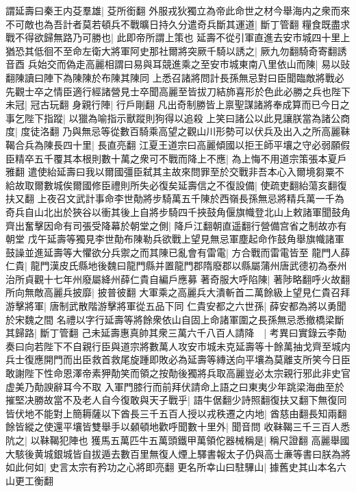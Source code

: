 謂延壽曰秦王内芟羣雄|{
	芟所銜翻}
外服戎狄獨立為帝此命世之材今舉海内之衆而來不可敵也為吾計者莫若頓兵不戰曠日持久分遣奇兵斷其運道|{
	斷丁管翻}
糧食既盡求戰不得欲歸無路乃可勝也|{
	此即帝所謂上策也}
延壽不從引軍直進去安市城四十里上猶恐其低徊不至命左衛大將軍阿史那社爾將突厥千騎以誘之|{
	厥九勿翻騎奇寄翻誘音酉}
兵始交而偽走高麗相謂曰易與耳競進乘之至安市城東南八里依山而陳|{
	易以䜴翻陳讀曰陣下為陳陳於布陳其陳同}
上悉召諸將問計長孫無忌對曰臣聞臨敵將戰必先觀士卒之情臣適行經諸營見士卒聞高麗至皆拔刀結斾喜形於色此必勝之兵也陛下未冠|{
	冠古玩翻}
身親行陣|{
	行戶剛翻}
凡出奇制勝皆上禀聖謀諸將奉成算而已今日之事乞陛下指蹤|{
	以獵為喻指示獸蹤則狗得以追殺}
上笑曰諸公以此見讓朕當為諸公商度|{
	度徒洛翻}
乃與無忌等從數百騎乘高望之觀山川形勢可以伏兵及出入之所高麗靺鞨合兵為陳長四十里|{
	長直亮翻}
江夏王道宗曰高麗傾國以拒王師平壤之守必弱願假臣精卒五千覆其本根則數十萬之衆可不戰而降上不應|{
	為上悔不用道宗策張本夏戶雅翻}
遣使紿延壽曰我以爾國彊臣弑其主故來問罪至於交戰非吾本心入爾境芻粟不給故取爾數城俟爾國修臣禮則所失必復矣延壽信之不復設備|{
	使疏吏翻紿蕩亥翻復扶又翻}
上夜召文武計事命李世勣將步騎萬五千陳於西嶺長孫無忌將精兵萬一千為奇兵自山北出於狹谷以衝其後上自將步騎四千挾鼓角偃旗幟登北山上敕諸軍聞鼓角齊出奮擊因命有司張受降幕於朝堂之側|{
	降戶江翻朝直遥翻行營備宫省之制故亦有朝堂}
戊午延壽等獨見李世勣布陳勒兵欲戰上望見無忌軍塵起命作鼓角舉旗幟諸軍鼓譟並進延壽等大懼欲分兵禦之而其陳已亂會有雷電|{
	方合戰而雷電皆至}
龍門人薛仁貴|{
	龍門漢皮氏縣地後魏曰龍門縣并置龍門郡隋廢郡以縣屬蒲州唐武德初為泰州治所貞觀十七年州廢屬絳州薛仁貴自編戶應募}
著奇服大呼陷陳|{
	著陟略翻呼火故翻}
所向無敵高麗兵披靡|{
	披普彼翻}
大軍乘之高麗兵大潰斬首二萬餘級上望見仁貴召拜游擊將軍|{
	唐制武散階游擊將軍從五品下同}
仁貴安都之六世孫|{
	薛安都為將以勇聞於宋魏之間}
名禮以字行延壽等將餘衆依山自固上命諸軍圍之長孫無忌悉撤橋梁斷其歸路|{
	斷丁管翻}
己未延壽惠真帥其衆三萬六千八百人請降　|{
	考異曰實錄云李勣奏曰向若陛下不自親行臣與道宗將數萬人攻安市城未克延壽等十餘萬抽戈齊至城内兵士復應開門而出臣救首救尾旋踵即敗必為延壽等縳送向平壤為莫離支所笑今日臣敢謝陛下性命恩澤帝素狎勣笑而領之按勣後獨將兵取高麗豈必太宗親行邪此非史官虚美乃勣諛辭耳今不取}
入軍門膝行而前拜伏請命上語之曰東夷少年跳梁海曲至於摧堅决勝故當不及老人自今復敢與天子戰乎|{
	語牛倨翻少詩照翻復扶又翻下無復同}
皆伏地不能對上簡耨薩以下酋長三千五百人授以戎秩遷之内地|{
	酋慈由翻長知兩翻}
餘皆縱之使還平壤皆雙舉手以顙頓地歡呼聞數十里外|{
	聞音問}
收靺鞨三千三百人悉阬之|{
	以靺鞨犯陣也}
獲馬五萬匹牛五萬頭鐵甲萬領佗器械稱是|{
	稱尺證翻}
高麗舉國大駭後黄城銀城皆自拔遁去數百里無復人煙上驛書報太子仍與高士亷等書曰朕為將如此何如|{
	史言太宗有矜功之心將即亮翻}
更名所幸山曰駐驆山|{
	據舊史其山本名六山更工衡翻}
